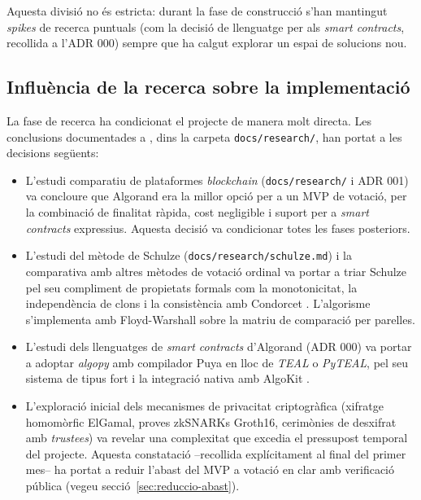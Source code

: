 Aquesta divisió no és estricta: durant la fase de construcció s'han
mantingut \emph{spikes} de recerca puntuals (com la decisió de llenguatge
per als \emph{smart contracts}, recollida a l'\ac{ADR} 000) sempre que ha
calgut explorar un espai de solucions nou.

\subsection{Influència de la recerca sobre la implementació}
\label{sec:influencia-recerca}

La fase de recerca ha condicionat el projecte de manera molt directa. Les
conclusions documentades a \cite{demochainrepo}, dins la carpeta
\texttt{docs/research/}, han portat a les decisions següents:

\begin{itemize}
    \item L'estudi comparatiu de plataformes \emph{blockchain}
    (\texttt{docs/research/} i \ac{ADR} 001) va concloure que Algorand era la
    millor opció per a un \ac{MVP} de votació, per la combinació de finalitat
    ràpida, cost negligible i suport per a \emph{smart contracts}
    expressius. Aquesta decisió va condicionar totes les fases posteriors.

    \item L'estudi del mètode de Schulze
    (\texttt{docs/research/schulze.md}) i la comparativa amb altres mètodes
    de votació ordinal va portar a triar Schulze pel seu compliment de
    propietats formals com la monotonicitat, la independència de clons i la
    consistència amb Condorcet \cite{schulze2011newmethod}. L'algorisme
    s'implementa amb Floyd-Warshall \cite{floyd1962algorithm} sobre la
    matriu de comparació per parelles.

    \item L'estudi dels llenguatges de \emph{smart contracts} d'Algorand
    (\ac{ADR} 000) va portar a adoptar \emph{algopy} amb compilador Puya
    \cite{algorandfoundation2024puya} en lloc de \emph{TEAL} o \emph{PyTEAL},
    pel seu sistema de tipus fort i la integració nativa amb AlgoKit
    \cite{algorandfoundation2024algokit}.

    \item L'exploració inicial dels mecanismes de privacitat criptogràfica
    (xifratge homomòrfic ElGamal, proves \acsp{zkSNARK} Groth16, cerimònies
    de desxifrat amb \emph{trustees}) va revelar una complexitat que excedia
    el pressupost temporal del projecte. Aquesta constatació --recollida
    explícitament al final del primer mes-- ha portat a reduir l'abast del
    \ac{MVP} a votació en clar amb verificació pública (vegeu
    secció~\ref{sec:reduccio-abast}).
\end{itemize}

